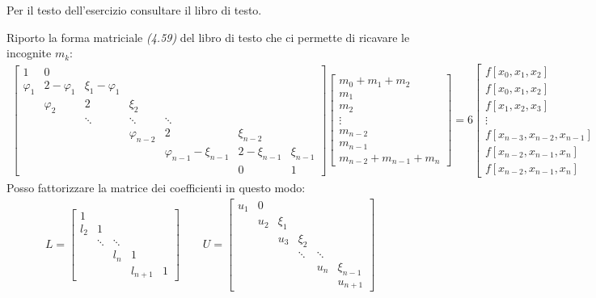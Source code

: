 \begin{exercise}[4.17] 
Per il testo dell'esercizio consultare il libro di testo.
\end{exercise} 
Riporto la forma matriciale \emph{(4.59)} del libro di testo che ci permette di
ricavare le incognite $m_{k}$:
\begin{displaymath}
\begin{split}
	\begin{bmatrix}
		1 & 0\\
		\varphi_{1} & 2- \varphi_{1} & \xi_{1} - \varphi_{1} \\
		&\varphi_{2} & 2 & \xi_{2} \\
		&	&	\ddots &	\ddots & \ddots \\
		&	&	&	\varphi_{n-2} & 2 & \xi_{n-2} \\
		&	&	&	& \varphi_{n-1} - \xi_{n-1} & 2 - \xi_{n-1}& \xi_{n-1}\\
		&	&	&	& 	&	0	& 1
	\end{bmatrix} %
	\begin{bmatrix}
		m_{0} + m_{1} + m_{2} \\
		m_{1} \\
		m_{2} \\
		\vdots \\
		m_{n-2} \\
		m_{n-1} \\
		m_{n-2} + m_{n-1} + m_{n}
	\end{bmatrix} = 6 %
	\begin{bmatrix}
		f[x_{0}, x_{1}, x_{2}] \\
		f[x_{0}, x_{1}, x_{2}] \\
		f[x_{1}, x_{2}, x_{3}] \\
		\vdots \\
		f[x_{n-3}, x_{n-2}, x_{n-1}] \\
		f[x_{n-2}, x_{n-1}, x_{n}] \\
		f[x_{n-2}, x_{n-1}, x_{n}]
	\end{bmatrix} 
\end{split}
\end{displaymath}
Posso fattorizzare la matrice dei coefficienti in questo modo:
\begin{displaymath}
\begin{split}
	L = \begin{bmatrix}
		1 \\
		l_{2} & 1  \\
			&	\ddots &	\ddots \\
			&	&	l_{n} & 1 \\
			&	&	& l_{n+1} & 1
	\end{bmatrix} \quad \quad
	U = \begin{bmatrix}
		u_{1} & 0\\
		 & u_{2} & \xi_{1} \\
		 & & u_{3} & \xi_{2} \\
		&	&	&	\ddots	& \ddots \\
		&	&	&	& u_{n}	& \xi_{n-1} \\
		&	&	&	&  & u_{n+1}
	\end{bmatrix} 
\end{split}
\end{displaymath}
